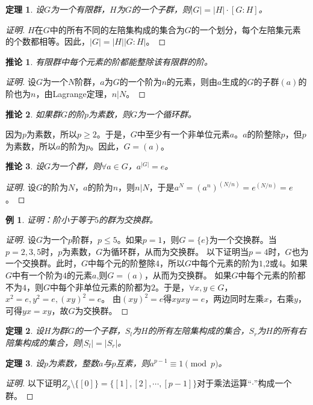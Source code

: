 \documentclass{article}
\newtheorem{Thm}{定理}
\newtheorem*{Example}{例}
\newtheorem{Cor}{推论}
\begin{document}
\begin{CJK*}{UTF8}{gbsn}
\begin{Thm}
 设$G$为一个有限群，$H$为$G$的一个子群，则$|G|=|H|\cdot [G:H]$。 
\end{Thm}
\begin{proof}[证明]
  $H$在$G$中的所有不同的左陪集构成的集合为$G$的一个划分，每个左陪集元素的个数都相等。因此，$|G|=|H||G:H|$。
\end{proof}
\begin{Cor}
有限群中每个元素的阶都能整除该有限群的阶。
\end{Cor}
\begin{proof}[证明]
  设$G$为一个$N$阶群，$a$为$G$的一个阶为$n$的元素，则由$a$生成的$G$的子群$(a)$的阶也为$n$，由Lagrange定理，$n|N$。
\end{proof}
\begin{Cor}
  如果群$G$的阶$p$为素数，则$G$为一个循环群。
\end{Cor}
因为$p$为素数，所以$p\geq 2$。于是，$G$中至少有一个非单位元素$a$。$a$的阶整除$p$，但$p$为素数，所以$a$的阶为$p$。因此，$G=(a)$。
\begin{Cor}
  设$G$为一个群，则$\forall a\in G$，$a^{|G|}=e$。
\end{Cor}
\begin{proof}[证明]
  设$G$的阶为$N$，$a$的阶为$n$，则$n|N$，于是$a^N=(a^n)^{(N/n)}=e^{(N/n)}=e$。
\end{proof}
\begin{Example}
  证明：阶小于等于$5$的群为交换群。
\end{Example}
\begin{proof}[证明]
  设$G$为一个$p$阶群，$p\leq 5$。如果$p=1$，则$G=\{e\}$为一个交换群。当$p=2,3,5$时，$p$为素数，$G$为循环群，从而为交换群。
  以下证明当$p=4$时，$G$也为一个交换群。此时，$G$中每个元的阶整除$4$，所以$G$中每个元素的阶为$1$,$2$或$4$。如果$G$中有一个阶为$4$的元素$a$,则$G=(a)$，从而为交换群。
  如果$G$中每个元素的阶都不为$4$，则$G$中每个非单位元素的阶都为$2$。于是，$\forall x,y\in G$，$x^2=e,y^2=e,(xy)^2=e$。
  由$(xy)^2=e$得$xyxy=e$，两边同时左乘$x$，右乘$y$，可得$yx=xy$，故$G$为交换群。

\end{proof}
\begin{Thm}
  设$H$为群$G$的一个子群，$S_l$为$H$的所有左陪集构成的集合，$S_r$为$H$的所有右陪集构成的集合，则$|S_l|=|S_r|$。
\end{Thm}

\begin{Thm}
  设$p$为素数，整数$a$与$p$互素，则$a^{p-1}\equiv 1 \pmod p$。
\end{Thm}
\begin{proof}[证明]
  以下证明$Z_p\setminus \{[0]\}=\{[1],[2],\cdots,[p-1]\}$对于乘法运算“$\cdot$”构成一个群。


\end{proof}
\end{CJK*}
\end{document}
